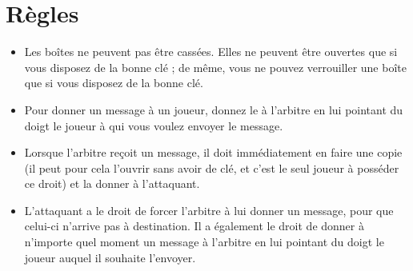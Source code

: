 \documentclass[a4paper,10pt]{article}
\begin{document}
\section{Règles}
\begin{itemize}
\item Les boîtes ne peuvent pas être cassées. Elles ne peuvent être ouvertes que si vous disposez de la bonne clé ; de même, vous ne pouvez verrouiller une boîte que si vous disposez de la bonne clé.
\item Pour donner un message à un joueur, donnez le à l'arbitre en lui pointant du doigt le joueur à qui vous voulez envoyer le message.
\item Lorsque l'arbitre reçoit un message, il doit immédiatement en faire une copie (il peut pour cela l'ouvrir sans avoir de clé, et c'est le seul joueur à posséder ce droit) et la donner à l'attaquant.
\item L'attaquant a le droit de forcer l'arbitre à lui donner un message, pour que celui-ci n'arrive pas à destination. Il a également le droit de donner à n'importe quel moment un message à l'arbitre en lui pointant du doigt le joueur auquel il souhaite l'envoyer. 
\end{itemize}
\end{document}
